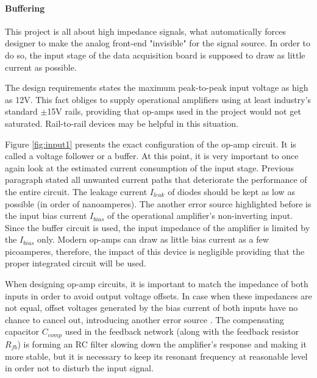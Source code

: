 \documentclass[12pt,a4paper]{article}
\begin{document}
\paragraph{Buffering}

This project is all about high impedance signals, what automatically forces designer to make the analog front-end "invisible" for the signal source. In order to do so, the input stage of the data acquisition board is supposed to draw as little current as possible. 
\par

The design requirements states the maximum peak-to-peak input voltage as high as 12V. This fact obliges to supply operational amplifiers using at least industry's standard $\pm$15V rails, providing that op-amps used in the project would not get saturated. Rail-to-rail devices may be helpful in this situation.
\par
Figure \ref{fig:input1} presents the exact configuration of the op-amp circuit. It is called a voltage follower or a buffer. At this point, it is very important to once again look at the estimated current consumption of the input stage. Previous paragraph stated all unwanted current paths that deteriorate the performance of the entire circuit. The leakage current $I_{leak}$ of diodes should be kept as low as possible (in order of nanoamperes). The another error source highlighted before is the input bias current $I_{bias}$ of the operational amplifier's non-inverting input. Since the buffer circuit is used, the input impedance of the amplifier is limited by the $I_{bias}$ only. Modern op-amps can draw as little bias current as a few picoamperes, therefore, the impact of this device is negligible providing that the proper integrated circuit will be used.
\par

When designing op-amp circuits, it is important to match the impedance of both inputs in order to avoid output voltage offsets. In case when these impedances are not equal, offset voltages generated by the bias current of both inputs have no chance to cancel out, introducing another error source \cite{companion}. The compensating capacitor $C_{comp}$ used in the feedback network (along with the feedback resistor $R_{fb}$) is forming an RC filter slowing down the amplifier's response and making it more stable, but it is necessary to keep its resonant frequency at reasonable level in order not to disturb the input signal.
\par
\end{document}
